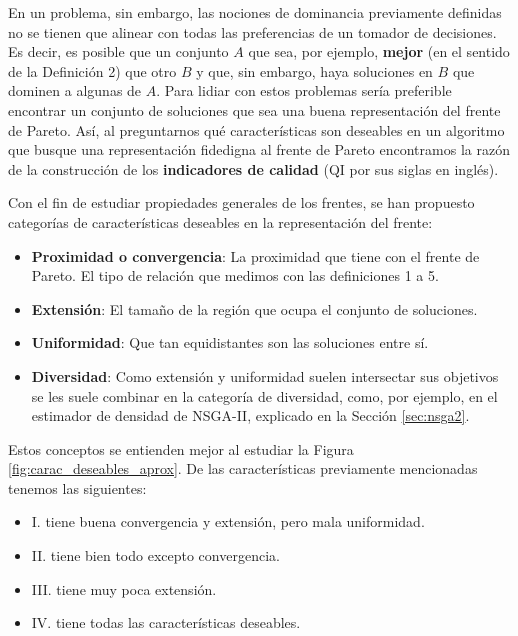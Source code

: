 En un problema, sin embargo, las nociones de dominancia previamente definidas no se tienen que alinear con todas las preferencias de un tomador de decisiones. Es decir, es posible que un conjunto $A$ que sea, por ejemplo, \textbf{mejor} (en el sentido de la Definición 2) que otro $B$ y que, sin embargo, haya soluciones en $B$ que dominen a algunas de $A$. Para lidiar con estos problemas sería preferible encontrar un conjunto de soluciones que sea una buena representación del frente de Pareto. Así, al preguntarnos qué características son deseables en un algoritmo que busque una representación fidedigna al frente de Pareto encontramos la razón de la construcción de los  \textbf{indicadores de calidad} (QI por sus siglas en inglés).


Con el fin de estudiar propiedades generales de los frentes, se han propuesto categorías de características deseables en la representación del frente:

\begin{itemize}
    \item \textbf{Proximidad o convergencia}: La proximidad que tiene con el frente de Pareto. El tipo de relación que medimos con las definiciones 1 a 5. 
    \item \textbf{Extensión}:  El tamaño de la región que ocupa el conjunto de soluciones. 
    \item \textbf{Uniformidad}: Que tan equidistantes son las soluciones entre sí.
    \item \textbf{Diversidad}: Como extensión y uniformidad suelen intersectar sus objetivos se les suele combinar en la categoría de diversidad, como, por ejemplo, en el estimador de densidad de NSGA-II, explicado en la Sección \ref{sec:nsga2}. 
\end{itemize}

Estos conceptos se  entienden mejor al estudiar la Figura \ref{fig:carac_deseables_aprox}. De las características previamente mencionadas tenemos las siguientes: 

\begin{itemize}
    \item I. tiene buena convergencia y extensión, pero mala uniformidad.
    \item II. tiene bien todo excepto convergencia.
    \item III. tiene muy poca extensión.
    \item IV. tiene todas las características deseables.
\end{itemize}

